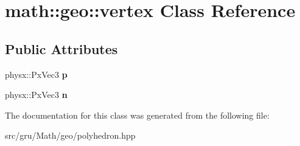 \hypertarget{classmath_1_1geo_1_1vertex}{\section{math\-:\-:geo\-:\-:vertex \-Class \-Reference}
\label{classmath_1_1geo_1_1vertex}
}
\subsection*{\-Public \-Attributes}
\begin{DoxyCompactItemize}
\item 
\hypertarget{classmath_1_1geo_1_1vertex_ac68d02726094408a170228135a68a1ef}{physx\-::\-Px\-Vec3 {\bfseries p}}\label{classmath_1_1geo_1_1vertex_ac68d02726094408a170228135a68a1ef}

\item 
\hypertarget{classmath_1_1geo_1_1vertex_af0bd124b0e264a44aa5ee617e423c95d}{physx\-::\-Px\-Vec3 {\bfseries n}}\label{classmath_1_1geo_1_1vertex_af0bd124b0e264a44aa5ee617e423c95d}

\end{DoxyCompactItemize}


\-The documentation for this class was generated from the following file\-:\begin{DoxyCompactItemize}
\item 
src/gru/\-Math/geo/polyhedron.\-hpp\end{DoxyCompactItemize}
